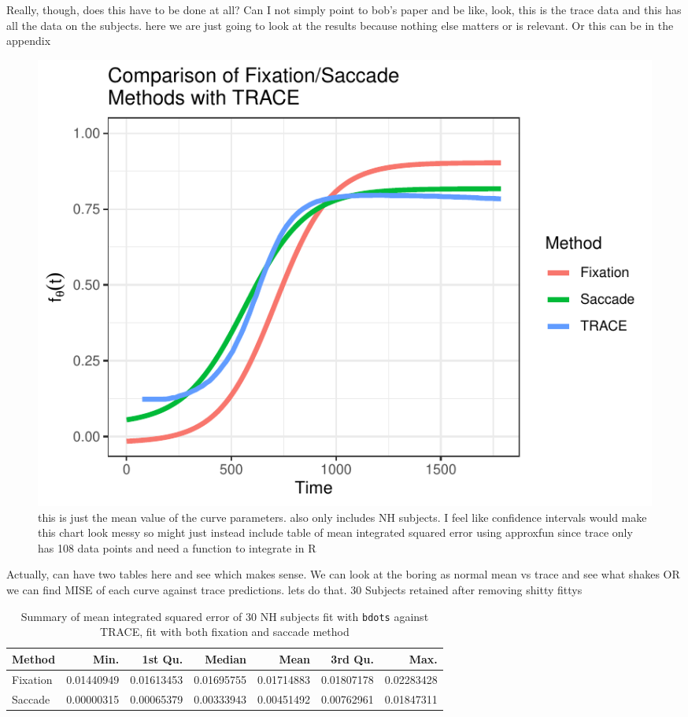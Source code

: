 \documentclass{article}
\newcommand{\xt}{\texttt}%
\begin{document}
Really, though, does this have to be done at all? Can I not simply point to bob's paper and be like, look, this is the trace data and this has all the data on the subjects. here we are just going to look at the results because nothing else matters or is relevant. Or this can be in the appendix


\begin{figure}[H]
\centering
\includegraphics{sac_fix_trace_compare.pdf}
\caption{this is just the mean value of the curve parameters. also only includes NH subjects. I feel like confidence intervals would make this chart look messy so might just instead include table of mean integrated squared error using approxfun since trace only has 108 data points and need a function to integrate in R}
\end{figure}

Actually, can have two tables here and see which makes sense. We can look at the boring as normal mean vs trace and see what shakes OR we can find MISE of each curve against trace predictions. lets do that. 30 Subjects retained after removing shitty fittys

\begin{table}[ht]
\centering
\begin{tabular}{lrrrrrr}
  \hline
Method & Min. & 1st Qu. & Median & Mean & 3rd Qu. & Max. \\ 
  \hline
Fixation & 0.01440949 & 0.01613453 & 0.01695755 & 0.01714883 & 0.01807178 & 0.02283428 \\ 
  Saccade & 0.00000315 & 0.00065379 & 0.00333943 & 0.00451492 & 0.00762961 & 0.01847311 \\ 
   \hline
\end{tabular}
\caption{Summary of mean integrated squared error of 30 NH subjects fit with \xt{bdots} against TRACE, fit with both fixation and saccade method}
\label{tab:mise_trace}
\end{table}
\end{document}
